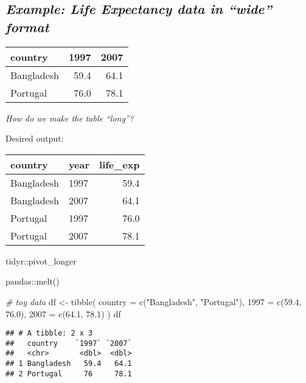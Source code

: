 \documentclass[
]{book}
\newenvironment{Shaded}{\begin{snugshade}}{\end{snugshade}}
\newcommand{\AttributeTok}[1]{\textcolor[rgb]{0.77,0.63,0.00}{#1}}
\newcommand{\CommentTok}[1]{\textcolor[rgb]{0.56,0.35,0.01}{\textit{#1}}}
\newcommand{\FloatTok}[1]{\textcolor[rgb]{0.00,0.00,0.81}{#1}}
\newcommand{\FunctionTok}[1]{\textcolor[rgb]{0.00,0.00,0.00}{#1}}
\newcommand{\NormalTok}[1]{#1}
\newcommand{\OtherTok}[1]{\textcolor[rgb]{0.56,0.35,0.01}{#1}}
\newcommand{\StringTok}[1]{\textcolor[rgb]{0.31,0.60,0.02}{#1}}
\begin{document}
\hypertarget{example-life-expectancy-data-in-wide-format}{%
\subsection{\texorpdfstring{\emph{Example: Life Expectancy data in ``wide'' format}}{Example: Life Expectancy data in ``wide'' format}}\label{example-life-expectancy-data-in-wide-format}}

\begin{longtable}[]{@{}lrr@{}}
\toprule
country & 1997 & 2007 \\
\midrule
\endhead
Bangladesh & 59.4 & 64.1 \\
Portugal & 76.0 & 78.1 \\
\bottomrule
\end{longtable}

{\emph{How do we make the table ``long''?}}

Desired output:

\begin{longtable}[]{@{}llr@{}}
\toprule
country & year & life\_exp \\
\midrule
\endhead
Bangladesh & 1997 & 59.4 \\
Bangladesh & 2007 & 64.1 \\
Portugal & 1997 & 76.0 \\
Portugal & 2007 & 78.1 \\
\bottomrule
\end{longtable}

tidyr::pivot\_longer

pandas::melt()

\begin{Shaded}
\begin{Highlighting}[]
\CommentTok{\# toy data}
\NormalTok{df }\OtherTok{\textless{}{-}} \FunctionTok{tibble}\NormalTok{(}
  \AttributeTok{country =} \FunctionTok{c}\NormalTok{(}\StringTok{"Bangladesh"}\NormalTok{, }\StringTok{"Portugal"}\NormalTok{),}
  \StringTok{\textasciigrave{}}\AttributeTok{1997}\StringTok{\textasciigrave{}} \OtherTok{=} \FunctionTok{c}\NormalTok{(}\FloatTok{59.4}\NormalTok{, }\FloatTok{76.0}\NormalTok{),}
  \StringTok{\textasciigrave{}}\AttributeTok{2007}\StringTok{\textasciigrave{}} \OtherTok{=} \FunctionTok{c}\NormalTok{(}\FloatTok{64.1}\NormalTok{, }\FloatTok{78.1}\NormalTok{)}
\NormalTok{  )}
\NormalTok{df}
\end{Highlighting}
\end{Shaded}

\begin{verbatim}
## # A tibble: 2 x 3
##   country    `1997` `2007`
##   <chr>       <dbl>  <dbl>
## 1 Bangladesh   59.4   64.1
## 2 Portugal     76     78.1
\end{verbatim}
\end{document}
